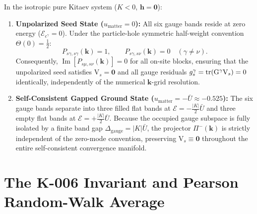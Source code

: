 \begin{corollary}
\label{cor:m1_3_flat_neutrality}
In the isotropic pure Kitaev system ($K < 0$, $\mathbf{h} = \mathbf{0}$):
\begin{enumerate}
\item \textbf{Unpolarized Seed State ($u_{\mathrm{matter}} = 0$):} All six gauge bands reside at zero energy ($\mathcal{E}_{c^\gamma} = 0$). Under the particle-hole symmetric half-weight convention $\Theta(0) = \frac{1}{2}$:
\begin{equation}
\label{eq:m1_3_flat_neutrality_seed}
P_{s\gamma, s\gamma}(\mathbf{k}) = 1, \qquad P_{s\gamma, s\nu}(\mathbf{k}) = 0 \quad (\gamma \ne \nu).
\end{equation}
Consequently, $\operatorname{Im}[P_{s\mu, s\nu}(\mathbf{k})] = 0$ for all on-site blocks, ensuring that the unpolarized seed satisfies $\mathrm{V}_s = \mathbf{0}$ and all gauge residuals $g_s^\gamma = \operatorname{tr}(\mathrm{G}^\gamma \mathrm{V}_s) = 0$ identically, independently of the numerical $\mathbf{k}$-grid resolution.
\item \textbf{Self-Consistent Gapped Ground State ($u_{\mathrm{matter}} = -\bar{U} \approx -0.525$):} The six gauge bands separate into three filled flat bands at $\mathcal{E} = -\frac{|K|}{2}\bar{U}$ and three empty flat bands at $\mathcal{E} = +\frac{|K|}{2}\bar{U}$. Because the occupied gauge subspace is fully isolated by a finite band gap $\Delta_{\mathrm{gauge}} = |K|\bar{U}$, the projector $\Pi^-(\mathbf{k})$ is strictly independent of the zero-mode convention, preserving $\mathrm{V}_s \equiv \mathbf{0}$ throughout the entire self-consistent convergence manifold.
\end{enumerate}
\end{corollary}

\section{The K-006 Invariant and Pearson Random-Walk Average}
\label{sec:m1_3_k006_invariant}

